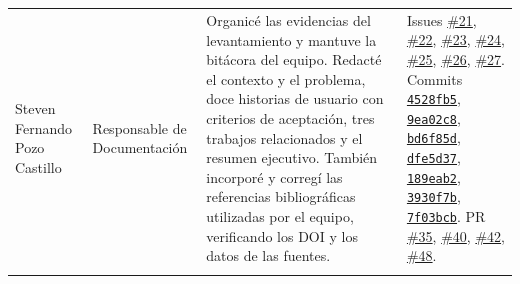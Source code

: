 \begin{xltabular}{\textwidth}{@{} >{\raggedright\arraybackslash}p{2.6cm} >{\raggedright\arraybackslash}p{2.4cm} >{\raggedright\arraybackslash}p{5.0cm} >{\raggedright\arraybackslash}p{4.0cm} @{}}
  Steven Fernando Pozo Castillo & Responsable de Documentación &
  Organicé las evidencias del levantamiento y mantuve la bitácora del equipo.
  Redacté el contexto y el problema, doce historias de usuario con criterios
  de aceptación, tres trabajos relacionados y el resumen ejecutivo. También
  incorporé y corregí las referencias bibliográficas utilizadas por el equipo,
  verificando los DOI y los datos de las fuentes. &
  Issues \href{https://github.com/reyshadow0/isr701-pfc/issues/21}{\#21}, \href{https://github.com/reyshadow0/isr701-pfc/issues/22}{\#22}, \href{https://github.com/reyshadow0/isr701-pfc/issues/23}{\#23}, \href{https://github.com/reyshadow0/isr701-pfc/issues/24}{\#24}, \href{https://github.com/reyshadow0/isr701-pfc/issues/25}{\#25}, \href{https://github.com/reyshadow0/isr701-pfc/issues/26}{\#26}, \href{https://github.com/reyshadow0/isr701-pfc/issues/27}{\#27}.
  Commits \href{https://github.com/reyshadow0/isr701-pfc/commit/4528fb5}{\texttt{4528fb5}}, \href{https://github.com/reyshadow0/isr701-pfc/commit/9ea02c8}{\texttt{9ea02c8}}, \href{https://github.com/reyshadow0/isr701-pfc/commit/bd6f85d}{\texttt{bd6f85d}}, \href{https://github.com/reyshadow0/isr701-pfc/commit/dfe5d37}{\texttt{dfe5d37}}, \href{https://github.com/reyshadow0/isr701-pfc/commit/189eab2}{\texttt{189eab2}}, \href{https://github.com/reyshadow0/isr701-pfc/commit/3930f7b}{\texttt{3930f7b}}, \href{https://github.com/reyshadow0/isr701-pfc/commit/7f03bcb}{\texttt{7f03bcb}}.
  PR \href{https://github.com/reyshadow0/isr701-pfc/pull/35}{\#35}, \href{https://github.com/reyshadow0/isr701-pfc/pull/40}{\#40}, \href{https://github.com/reyshadow0/isr701-pfc/pull/42}{\#42}, \href{https://github.com/reyshadow0/isr701-pfc/pull/48}{\#48}. \\
  \addlinespace

\end{xltabular}
